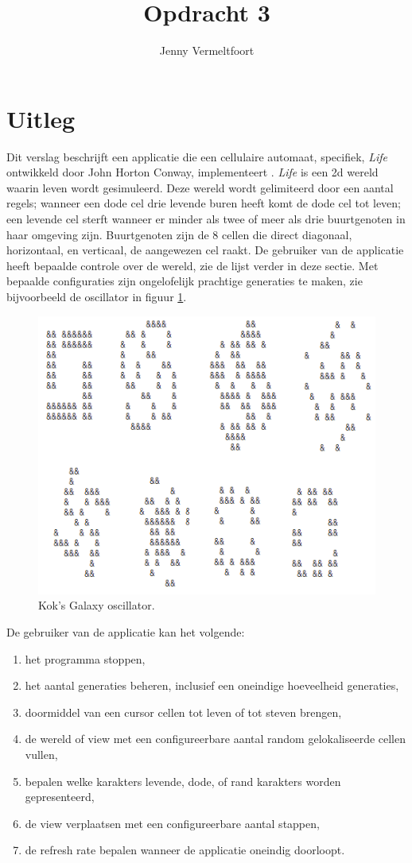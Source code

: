 \documentclass[10pt]{article}
\title{Opdracht 3}
\author{Jenny Vermeltfoort}
\begin{document}
\def\tablename{Tabel}

\maketitle

\section{Uitleg}
Dit verslag beschrijft een applicatie die een cellulaire automaat, specifiek, \textit{Life} ontwikkeld door John Horton
Conway, implementeert \cite{martin-garder}. \textit{Life} is een 2d wereld waarin leven wordt gesimuleerd. Deze wereld
wordt gelimiteerd door een aantal regels; wanneer een dode cel drie levende buren heeft komt de dode cel tot leven; een
levende cel sterft wanneer er minder als twee of meer als drie buurtgenoten in haar omgeving zijn. Buurtgenoten zijn de
8 cellen die direct diagonaal, horizontaal, en verticaal, de aangewezen cel raakt. De gebruiker van de applicatie heeft
bepaalde controle over de wereld, zie de lijst verder in deze sectie. Met bepaalde configuraties zijn ongelofelijk
prachtige generaties te maken, zie bijvoorbeeld de oscillator in figuur \ref{fig:kok}.

\hfill
\begin{figure}[H]
    \centering
    \includegraphics[width=0.6\linewidth]{ga_all}
    \caption{Kok's Galaxy oscillator\cite{galaxy-blog}. }
    \label{fig:kok}
\end{figure}
\hfill

De gebruiker van de applicatie kan het volgende:
\begin{enumerate}
    \item het programma stoppen,
    \item het aantal generaties beheren, inclusief een oneindige hoeveelheid generaties,
    \item doormiddel van een cursor cellen tot leven of tot steven brengen,
    \item de wereld of view met een configureerbare aantal random gelokaliseerde cellen vullen,
    \item bepalen welke karakters levende, dode, of rand karakters worden gepresenteerd,
    \item de view verplaatsen met een configureerbare aantal stappen,
    \item de refresh rate bepalen wanneer de applicatie oneindig doorloopt.
\end{enumerate}
\end{document}
